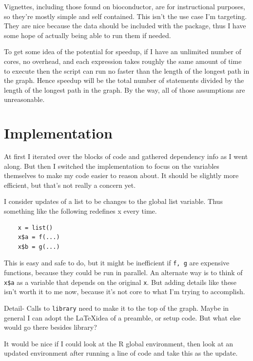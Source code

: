 \documentclass[12pt]{article}
\begin{document}
Vignettes, including those found on bioconductor, are for instructional
purposes, so they're mostly simple and self contained. This isn't the use
case I'm targeting. They are nice because the data should be included with
the package, thus I have some hope of actually being able to run them if
needed.

To get some idea of the potential for speedup, if I have an unlimited
number of cores, no overhead, and each expression takes roughly the same
amount of time to execute then the script can run no faster than the length
of the longest path in the graph. Hence speedup will be the total number
of statements divided by the length of the longest path in the graph.
By the way, all of those assumptions are unreasonable.



\section{Implementation}

At first I iterated over the blocks of code and gathered dependency info as
I went along. But then I switched the implementation to focus on the variables
themselves to make my code easier to reason about. It should be slightly
more efficient, but that's not really a concern yet.

I consider updates of a list to be changes to the global list variable.
Thus something like the following redefines x every time. 

\begin{verbatim}
    x = list()
    x$a = f(...)
    x$b = g(...)
\end{verbatim}
 
This is easy and safe to do, but it might be inefficient if \texttt{f, g}
are expensive functions, because they could be run in parallel. An
alternate way is to think of \texttt{x\$a} as a variable that depends on
the original \texttt{x}. But adding details like these isn't worth it to me
now, because it's not core to what I'm trying to accomplish.

Detail- Calls to \texttt{library} need to make it to the top of the graph. Maybe in
general I can adopt the \LaTeX idea of a preamble, or setup code. But what else would go
there besides library?

It would be nice if I could look at the R global environment, then
look at an updated environment after running a line of code and take this
as the update. 
\end{document}
